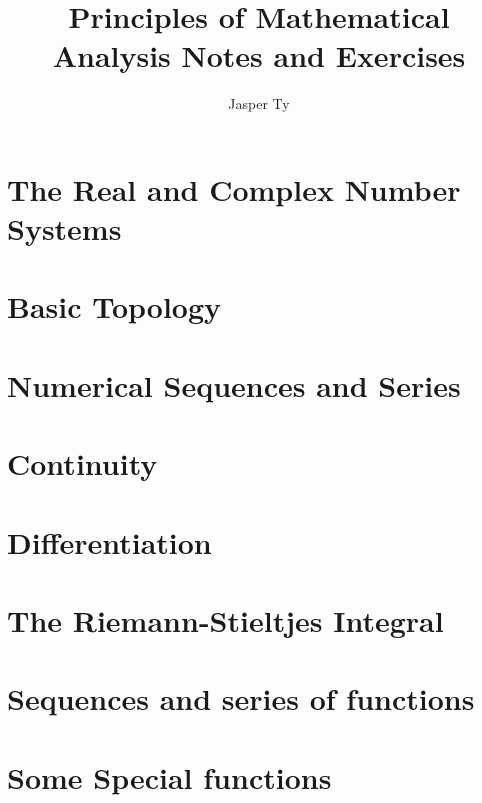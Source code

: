 \documentclass{book}
\begin{document}
\title{Principles of Mathematical Analysis Notes and Exercises}
\author{Jasper Ty}
\date{}
\maketitle

\tableofcontents
\chapter{The Real and Complex Number Systems}
\chapter{Basic Topology}
\chapter{Numerical Sequences and Series}
\chapter{Continuity}
\chapter{Differentiation}
\chapter{The Riemann-Stieltjes Integral}
\chapter{Sequences and series of functions}

\chapter{Some Special functions}
\end{document}

